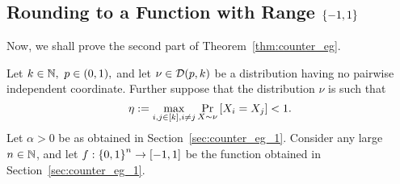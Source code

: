 
\subsection{Rounding to a Function with Range $\left\{ -1,1 \right\}$}\label{sec:counter_eg_2}

Now, we shall prove the second part of Theorem~\ref{thm:counter_eg}.

Let $k\in \mathbb{N},\ p\in (0,1),$ and let $\nu \in \mathcal D(p,k)$ be a distribution having no pairwise independent coordinate.
Further suppose that the distribution $\nu$ is such that \[\eta := \max_{i,j\in [k], i\not= j} \Pr_{X\sim \nu}\left[ X_i=X_j \right] < 1.\]
Let $\alpha>0$ be as obtained in Section~\ref{sec:counter_eg_1}.
Consider any large $n\in \mathbb{N}$, and let $f:\left\{ 0,1 \right\}^n\to [-1,1]$ be the function obtained in Section~\ref{sec:counter_eg_1}.

